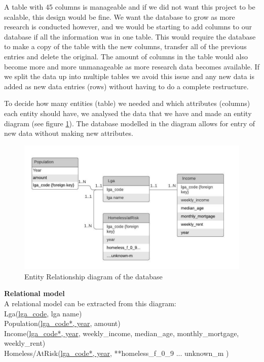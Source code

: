 \documentclass[12pt, a4paper]{article}
\begin{document}
A table with 45 columns is manageable and if we did not want this project to be scalable, this design would be fine. We want the database to grow as more research is conducted however, and we would be starting to add columns to our database if all the information was in one table. This would require the database to make a copy of the table with the new columns, transfer all of the previous entries and delete the original. The amount of columns in the table would also become more and more unmanageable as more research data becomes available. If we split the data up into multiple tables we avoid this issue and any new data is added as new data entries (rows) without having to do a complete restructure.

To decide how many entities (table) we needed and which attributes (columns) each entity should have, we analysed the data that we have and made an entity diagram (see figure \ref{fig:erdiagram}). The database modelled in the diagram allows for entry of new data without making new attributes. 

\begin{figure}[h]
\centering
\includegraphics[scale=1]{ERDiagram.jpg} 
\caption{Entity Relationship diagram of the database}
\label{fig:erdiagram}
\end{figure}

\textbf{Relational model}\\
A relational model can be extracted from this diagram:\\
Lga(\underline{lga\_code}, lga name)\\
Population(\underline{lga\_code*, year}, amount)\\
Income(\underline{lga\_code*, year}, weekly\_income, median\_age, monthly\_mortgage, weekly\_rent)\\
Homeless/AtRisk(\underline{lga\_code*, year}, **homeless\_f\_0\_9 ... unknown\_m )\\
\end{document}
